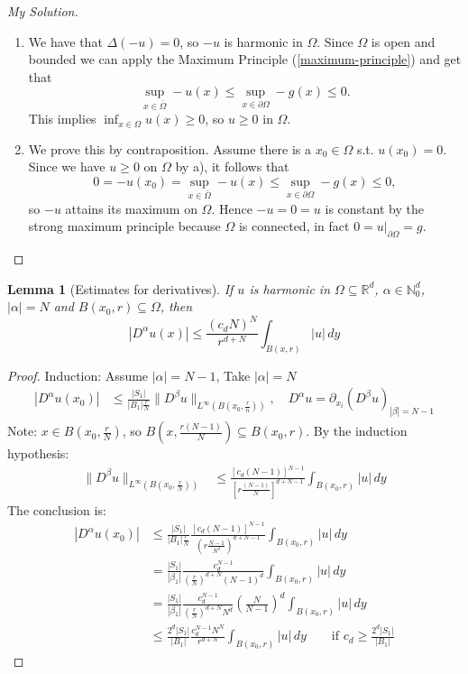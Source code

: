 \documentclass{report}
\theoremstyle{tommy}
\newtheorem{lem}[defn]{Lemma}
\begin{document}
  \begin{proof}[My Solution]
    \begin{enumerate}[label=\alph*)]
      \item We have that \(\Delta (-u) = 0\), so \(-u\) is harmonic in \(\Omega\). Since \(\Omega\) is open and bounded we can apply the Maximum Principle (\ref{maximum-principle}) and get that
      \[\sup_{x \in \bar \Omega} -u(x) \le \sup_{x \in \partial \Omega} -g(x) \le 0.\]
      This implies \(\inf_{x \in \Omega} u(x) \ge 0\), so \(u \ge 0\) in \(\Omega\).
      \item We prove this by contraposition. Assume there is a \(x_0 \in \Omega\) s.t. \(u(x_0) = 0\). Since we have \(u \ge 0\) on \(\Omega\) by a), it follows that
      \[0 = -u(x_0) = \sup_{x \in \bar \Omega} -u(x) \le \sup_{x \in \partial \Omega} -g(x) \le 0,\]
      so \(-u\) attains its maximum on \(\Omega\). Hence \(-u = 0 = u\) is constant by the strong maximum principle because \(\Omega\) is connected, in fact \(0 = u|_{\partial \Omega} = g\). \qedhere
    \end{enumerate}
  \end{proof}

  \begin{lem}[Estimates for derivatives]\label{estimates-of-derivatives}
    If \(u\) is harmonic in \(\Omega \subseteq \mathbb{R}^d\), \(\alpha \in \mathbb{N}_0^d\), \(|\alpha| = N\) and \(B(x_0, r) \subseteq \Omega\), then 
    \[|D^\alpha u(x)| \le \frac{(c_dN)^N}{r^{d+N}} \int_{B(x, r)} |u| \, dy\]
  \end{lem}

  \begin{proof}
    Induction: Assume \(|\alpha| = N-1\), Take \(|\alpha| = N\)
    \begin{align*}
      |D^\alpha u(x_0)| 
      &\le \frac{|S_1|}{|B_1|\frac{r}{N}} \| D^\beta u \|_{L^\infty (B(x_0, \frac{r}{n}))}, \quad D^\alpha u = \partial_{x_i}(D^\beta u)_{|\beta| = N-1}
    \end{align*}
    Note: \(x \in B(x_0, \frac{r}{N})\), so \(B(x, \frac{r(N-1)}{N}) \subseteq B(x_0, r)\). By the induction hypothesis:
    \begin{align*}
      \|D^\beta u\|_{L^\infty(B(x_0, \frac{r}{N}))} 
      &\le \frac{[c_d (N-1)]^{N-1}}{[r \frac{(N-1)}{N}]^{d+N-1}} \int_{B(x_0, r)} |u| \, dy
    \end{align*}
    The conclusion is:
    \begin{align*}
      |D^\alpha u (x_0)|
      &\le \frac{|S_1|}{|B_1| \frac{r}{N}} \frac{[c_d(N-1)]^{N-1}}{\left(r \frac{N-1}{N^d}\right)^{d + N - 1}} \int_{B(x_0, r)} |u| \, dy \\
      &= \frac{|S_1|}{|\beta_1|} \frac{c_d^{N-1}}{\left(\frac{r}{N}\right)^{d+N} (N-1)^d} \int_{B(x_0, r)} |u| \, dy \\
      &= \frac{|S_1|}{|\beta_1|} \frac{c_d^{N-1}}{\left(\frac{r}{N}\right)^{d+N} N^d} \left(\frac{N}{N-1}\right)^d \int_{B(x_0, r)} |u| \, dy \\
      &\le \frac{2^d |S_1|}{|B_1|} \frac{c_d^{N-1} N^N}{r^{d+N}} \int_{B(x_0, r)} |u| \, dy \qquad \text{if } c_d \ge \frac{2^d |S_1|}{|B_1|}
    \end{align*}
  \end{proof}
\end{document}
